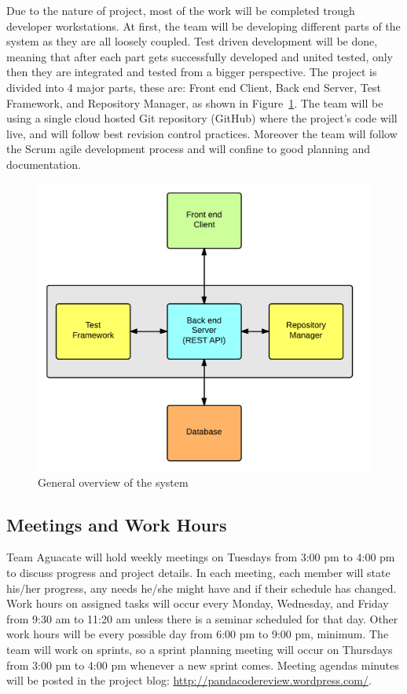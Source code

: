 
Due to the nature of project, most of the work will be completed trough
developer workstations. At first, the team will be developing different parts of
the system as they are all loosely coupled. Test driven development will be
done, meaning that after each part gets successfully developed and united
tested, only then they are integrated and tested from a bigger perspective. The
project is divided into 4 major parts, these are: Front end Client, Back end
Server, Test Framework, and Repository Manager, as shown in Figure~\ref{arqu}.
The team will be using a single
cloud hosted Git repository (GitHub) where the project's code will live, and
will follow best revision control practices. Moreover the team will follow the
Scrum agile development process and will confine to good planning and
documentation.

\begin{figure}[H]
	\centering
	\includegraphics[width=\textwidth]{img/bigArquitectOverview}
	\caption{General overview of the system\label{arqu}}
\end{figure}

\subsection{Meetings and Work Hours}

Team Aguacate will hold weekly meetings on Tuesdays from 3:00 pm to 4:00 pm to
discuss progress and project details. In each meeting, each member will state
his/her progress, any needs he/she might have and if their schedule has changed.
Work hours on assigned tasks will occur every Monday, Wednesday, and Friday from
9:30 am to 11:20 am unless there is a seminar scheduled for that day. Other work
hours will be every possible day from 6:00 pm to 9:00 pm, minimum. The team will
work on sprints, so a sprint planning meeting will occur on Thursdays from 3:00
pm to 4:00 pm whenever a new sprint comes. Meeting agendas minutes will be
posted in the project blog: \url{http://pandacodereview.wordpress.com/}.

